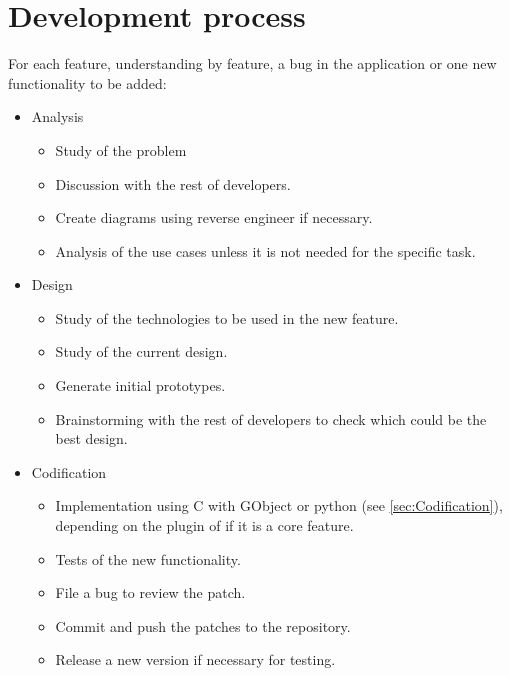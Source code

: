 
\chapter{Development process}


For each feature, understanding by feature, a bug in the application or one new functionality to be added:

\begin{itemize}
  \item Analysis
    \begin{itemize}
      \item Study of the problem
      \item Discussion with the rest of developers.
      \item Create diagrams using reverse engineer if necessary.
      \item Analysis of the use cases unless it is not needed for the specific task.
    \end{itemize}
  \item Design
    \begin{itemize}
      \item Study of the technologies to be used in the new feature.
      \item Study of the current design.
      \item Generate initial prototypes.
      \item Brainstorming with the rest of developers to check which could be the best design.
    \end{itemize}
  \item Codification
    \begin{itemize}
      \item Implementation using C with GObject or python (see \ref{sec:Codification}), depending on the plugin of if it is a core feature.
      \item Tests of the new functionality.
      \item File a bug to review the patch.
      \item Commit and push the patches to the \GNOME repository.
      \item Release a new version if necessary for testing.
    \end{itemize}
\end{itemize}
